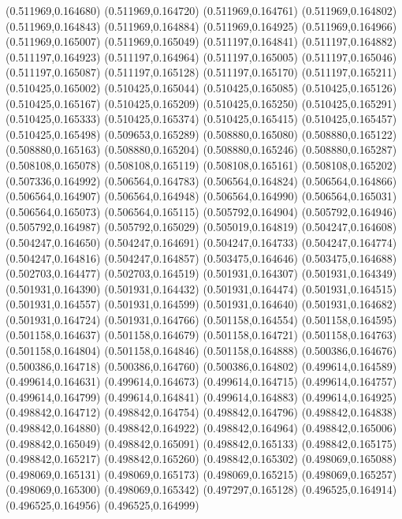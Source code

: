 (0.511969,0.164680)
(0.511969,0.164720)
(0.511969,0.164761)
(0.511969,0.164802)
(0.511969,0.164843)
(0.511969,0.164884)
(0.511969,0.164925)
(0.511969,0.164966)
(0.511969,0.165007)
(0.511969,0.165049)
(0.511197,0.164841)
(0.511197,0.164882)
(0.511197,0.164923)
(0.511197,0.164964)
(0.511197,0.165005)
(0.511197,0.165046)
(0.511197,0.165087)
(0.511197,0.165128)
(0.511197,0.165170)
(0.511197,0.165211)
(0.510425,0.165002)
(0.510425,0.165044)
(0.510425,0.165085)
(0.510425,0.165126)
(0.510425,0.165167)
(0.510425,0.165209)
(0.510425,0.165250)
(0.510425,0.165291)
(0.510425,0.165333)
(0.510425,0.165374)
(0.510425,0.165415)
(0.510425,0.165457)
(0.510425,0.165498)
(0.509653,0.165289)
(0.508880,0.165080)
(0.508880,0.165122)
(0.508880,0.165163)
(0.508880,0.165204)
(0.508880,0.165246)
(0.508880,0.165287)
(0.508108,0.165078)
(0.508108,0.165119)
(0.508108,0.165161)
(0.508108,0.165202)
(0.507336,0.164992)
(0.506564,0.164783)
(0.506564,0.164824)
(0.506564,0.164866)
(0.506564,0.164907)
(0.506564,0.164948)
(0.506564,0.164990)
(0.506564,0.165031)
(0.506564,0.165073)
(0.506564,0.165115)
(0.505792,0.164904)
(0.505792,0.164946)
(0.505792,0.164987)
(0.505792,0.165029)
(0.505019,0.164819)
(0.504247,0.164608)
(0.504247,0.164650)
(0.504247,0.164691)
(0.504247,0.164733)
(0.504247,0.164774)
(0.504247,0.164816)
(0.504247,0.164857)
(0.503475,0.164646)
(0.503475,0.164688)
(0.502703,0.164477)
(0.502703,0.164519)
(0.501931,0.164307)
(0.501931,0.164349)
(0.501931,0.164390)
(0.501931,0.164432)
(0.501931,0.164474)
(0.501931,0.164515)
(0.501931,0.164557)
(0.501931,0.164599)
(0.501931,0.164640)
(0.501931,0.164682)
(0.501931,0.164724)
(0.501931,0.164766)
(0.501158,0.164554)
(0.501158,0.164595)
(0.501158,0.164637)
(0.501158,0.164679)
(0.501158,0.164721)
(0.501158,0.164763)
(0.501158,0.164804)
(0.501158,0.164846)
(0.501158,0.164888)
(0.500386,0.164676)
(0.500386,0.164718)
(0.500386,0.164760)
(0.500386,0.164802)
(0.499614,0.164589)
(0.499614,0.164631)
(0.499614,0.164673)
(0.499614,0.164715)
(0.499614,0.164757)
(0.499614,0.164799)
(0.499614,0.164841)
(0.499614,0.164883)
(0.499614,0.164925)
(0.498842,0.164712)
(0.498842,0.164754)
(0.498842,0.164796)
(0.498842,0.164838)
(0.498842,0.164880)
(0.498842,0.164922)
(0.498842,0.164964)
(0.498842,0.165006)
(0.498842,0.165049)
(0.498842,0.165091)
(0.498842,0.165133)
(0.498842,0.165175)
(0.498842,0.165217)
(0.498842,0.165260)
(0.498842,0.165302)
(0.498069,0.165088)
(0.498069,0.165131)
(0.498069,0.165173)
(0.498069,0.165215)
(0.498069,0.165257)
(0.498069,0.165300)
(0.498069,0.165342)
(0.497297,0.165128)
(0.496525,0.164914)
(0.496525,0.164956)
(0.496525,0.164999)
